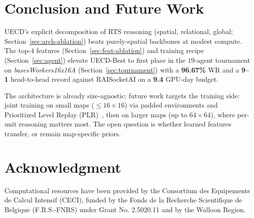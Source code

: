 \documentclass[conference]{IEEEtran}
\newif\ifanonymous
\newcommand{\code}[1]{{\ttfamily\hyphenchar\font=45\relax #1}}
\begin{document}
\section{Conclusion and Future Work}
\label{sec:conclusion}

\code{UECD}'s explicit decomposition of RTS reasoning (spatial, relational, global; Section~\ref{sec:arch-ablation}) beats purely-spatial backbones at modest compute. The top-$4$ features (Section~\ref{sec:feat-ablation}) and training recipe (Section~\ref{sec:agent}) elevate \code{UECD-Best} to first place in the $19$-agent tournament on \emph{basesWorkers16x16A} (Section~\ref{sec:tournament}) with a \textbf{96.67\%} WR and a \textbf{9--1} head-to-head record against RAISocketAI on a \textbf{9.4} GPU-day budget.

The architecture is already size-agnostic; future work targets the training side: joint training on small maps ($\leq\!16{\times}16$) via padded environments and Prioritized Level Replay (PLR)~\cite{jiangPrioritizedLevelReplay2021}, then on larger maps (up to $64{\times}64$), where per-unit reasoning matters most. The open question is whether learned features transfer, or remain map-specific priors.

\section*{Acknowledgment}
\ifanonymous
Computational resources have been provided by the \textit{Anonymous}, funded by the \textit{Anonymous} under Grant \textit{Anonymous}
\else
Computational resources have been provided by the Consortium des Equipements de Calcul Intensif (CECI), funded by the Fonds de la Recherche Scientifique de Belgique (F.R.S.-FNRS) under Grant No. 2.5020.11 and by the Walloon Region.
\fi


% 
% 
\end{document}
